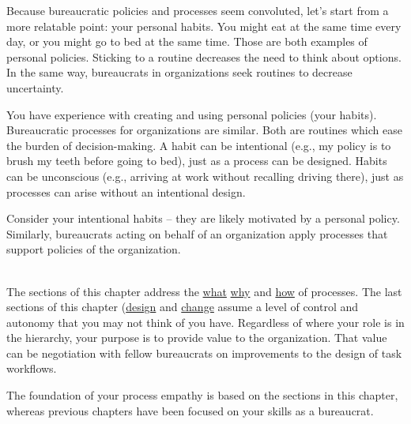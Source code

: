 
Because bureaucratic policies and processes seem convoluted, let's start from a more relatable point: your personal habits.
You might eat at the same time every day, or you might go to bed at the same time. Those are both examples of personal policies. Sticking to a routine decreases the need to think about options. In the same way, bureaucrats in organizations seek routines to decrease uncertainty. 

You have experience with creating and using personal policies (your habits).  Bureaucratic processes for organizations are similar.
Both are routines which ease the burden of decision-making. A habit can be intentional (e.g., my policy is to brush my teeth before going to bed), just as a process can be designed. Habits can be unconscious (e.g., arriving at work without recalling driving there), just as processes can arise without an intentional design. 

Consider your intentional habits -- they are likely motivated by a personal policy. Similarly, bureaucrats acting on behalf of an organization apply processes that support policies of the organization.

\ \\

The sections of this chapter address 
the \hyperref[sec:definition-of-process]{what}\iftoggle{haspagenumbers}{(page~\pageref{sec:definition-of-process}), }{,}
\hyperref[sec:why-processes-exist]{why}\iftoggle{haspagenumbers}{(page~\pageref{sec:why-processes-exist}), }{,}
and 
\hyperref[sec:process-chaos]{how} \iftoggle{haspagenumbers}{(page~\pageref{sec:process-chaos}) }{}
of processes. 
The last sections of this chapter 
(\hyperref[sec:design-of-processes]{design} 
\iftoggle{haspagenumbers}{on page~\pageref{sec:design-of-processes} }{}
and 
\hyperref[sec:change-a-process]{change}\iftoggle{haspagenumbers}{on page~\pageref{sec:change-a-process})}{)} 
assume a level of control and autonomy that you may not think of you have. Regardless of where your role is in the hierarchy, your purpose is to provide value to the organization. That value can be negotiation with fellow bureaucrats on improvements to the design of task workflows. 

The foundation of your \gls{process empathy} is based on the sections in this chapter, whereas previous chapters have been focused on your skills as a bureaucrat. 